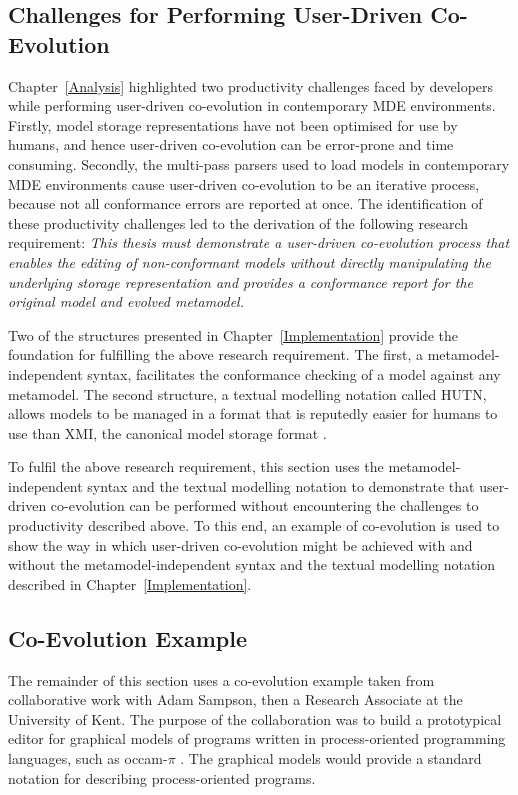 \subsection{Challenges for Performing User-Driven Co-Evolution}
Chapter~\ref{Analysis} highlighted two productivity challenges faced by developers while performing user-driven co-evolution in contemporary MDE environments. Firstly, model storage representations have not been optimised for use by humans, and hence user-driven co-evolution can be error-prone and time consuming. Secondly, the multi-pass parsers used to load models in contemporary MDE environments cause user-driven co-evolution to be an iterative process, because not all conformance errors are reported at once. The identification of these productivity challenges led to the derivation of the following research requirement: \emph{This thesis must demonstrate a user-driven co-evolution process that enables the editing of non-conformant models without directly manipulating the underlying storage representation and provides a conformance report for the original model and evolved metamodel.}

Two of the structures presented in Chapter~\ref{Implementation} provide the foundation for fulfilling the above research requirement. The first, a metamodel-independent syntax, facilitates the conformance checking of a model against any metamodel. The second structure, a textual modelling notation called HUTN, allows models to be managed in a format that is reputedly easier for humans to use than XMI, the canonical model storage format \cite{hutn}.

To fulfil the above research requirement, this section uses the metamodel-independent syntax and the textual modelling notation to demonstrate that user-driven co-evolution can be performed without encountering the challenges to productivity described above. To this end, an example of co-evolution is used to show the way in which user-driven co-evolution might be achieved with and without the metamodel-independent syntax and the textual modelling notation described in Chapter~\ref{Implementation}.

\subsection{Co-Evolution Example}
The remainder of this section uses a co-evolution example taken from collaborative work with Adam Sampson, then a Research Associate at the University of Kent. The purpose of the collaboration was to build a prototypical editor for graphical models of programs written in process-oriented programming languages, such as occam-$\pi$ \cite{occam_pi}. The graphical models would provide a standard notation for describing process-oriented programs.

